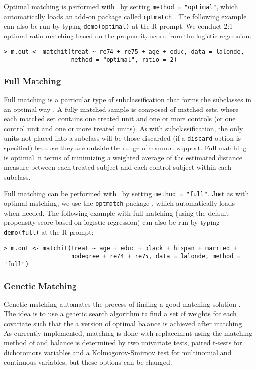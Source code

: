 Optimal matching is performed with \MatchIt\ by setting \texttt{method
  = "optimal"}, which automatically loads an add-on package called
\texttt{optmatch} \citep{Hansen04}.  The following example can also be
run by typing {\tt demo(optimal)} at the R prompt.  We conduct 2:1 optimal
ratio matching based on the propensity score from the logistic
regression.
\begin{verbatim}
> m.out <- matchit(treat ~ re74 + re75 + age + educ, data = lalonde, 
                   method = "optimal", ratio = 2)
\end{verbatim}

\subsubsection{Full Matching}
\label{subsubsec:full}

Full matching is a particular type of subclassification that forms the
subclasses in an optimal way \citep{Rosenbaum02, Hansen04}.  A fully
matched sample is composed of matched sets, where each matched set
contains one treated unit and one or more controls (or one control
unit and one or more treated units).  As with subclassification, the
only units not placed into a subclass will be those discarded (if a
\texttt{discard} option is specified) because they are outside the
range of common support.  Full matching is optimal in terms of
minimizing a weighted average of the estimated distance measure
between each treated subject and each control subject within each
subclass.

Full matching can be performed with \MatchIt\ by setting
\texttt{method = "full"}.  Just as with optimal matching, we use the
\texttt{optmatch} package \citep{Hansen04}, which automatically loads
when needed.  The following example with full matching (using the
default propensity score based on logistic regression) can also be run
by typing {\tt demo(full)} at the R prompt:
\begin{verbatim}
> m.out <- matchit(treat ~ age + educ + black + hispan + married +
                   nodegree + re74 + re75, data = lalonde, method = "full")
\end{verbatim}

\subsubsection{Genetic Matching}
\label{subsub:genetic}

Genetic matching automates the process of finding a good matching
solution \citep{DiaSek05}.  The idea is to use a genetic search
algorithm to find a set of weights for each covariate such that the a
version of optimal balance is achieved after matching.  As currently
implemented, matching is done with replacement using the matching
method of \citet{AbaImb07} and balance is determined by two univariate
tests, paired t-tests for dichotomous variables and a
Kolmogorov-Smirnov test for multinomial and continuous variables, but
these options can be changed.

